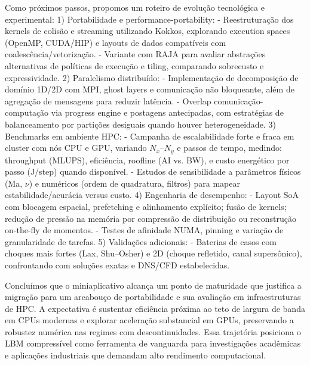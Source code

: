 Como próximos passos, propomos um roteiro de evolução tecnológica e experimental:
1) Portabilidade e performance-portability:
   - Reestruturação dos kernels de colisão e streaming utilizando Kokkos, explorando execution spaces (OpenMP, CUDA/HIP) e layouts de dados compatíveis com coalescência/vetorização.
   - Variante com RAJA para avaliar abstrações alternativas de políticas de execução e tiling, comparando sobrecusto e expressividade.
2) Paralelismo distribuído:
   - Implementação de decomposição de domínio 1D/2D com MPI, ghost layers e comunicação não bloqueante, além de agregação de mensagens para reduzir latência.
   - Overlap comunicação-computação via progress engine e postagens antecipadas, com estratégias de balanceamento por partições desiguais quando houver heterogeneidade.
3) Benchmarks em ambiente HPC:
   - Campanha de escalabilidade forte e fraca em cluster com nós CPU e GPU, variando \(N_x\)–\(N_y\) e passos de tempo, medindo: throughput (MLUPS), eficiência, roofline (AI vs. BW), e custo energético por passo (J/step) quando disponível.
   - Estudos de sensibilidade a parâmetros físicos (Ma, \(\nu\)) e numéricos (ordem de quadratura, filtros) para mapear estabilidade/acurácia versus custo.
4) Engenharia de desempenho:
   - Layout SoA com blocagem espacial, prefetching e alinhamento explícito; fusão de kernels; redução de pressão na memória por compressão de distribuição ou reconstrução on-the-fly de momentos.
   - Testes de afinidade NUMA, pinning e variação de granularidade de tarefas.
5) Validações adicionais:
   - Baterias de casos com choques mais fortes (Lax, Shu–Osher) e 2D (choque refletido, canal supersônico), confrontando com soluções exatas e DNS/CFD estabelecidas.

Concluímos que o miniaplicativo alcança um ponto de maturidade que justifica a migração para um arcabouço de portabilidade e sua avaliação em infraestruturas de HPC. A expectativa é sustentar eficiência próxima ao teto de largura de banda em CPUs modernas e explorar aceleração substancial em GPUs, preservando a robustez numérica nas regimes com descontinuidades.
Essa trajetória posiciona o LBM compressível como ferramenta de vanguarda para investigações acadêmicas e aplicações industriais que demandam alto rendimento computacional.
